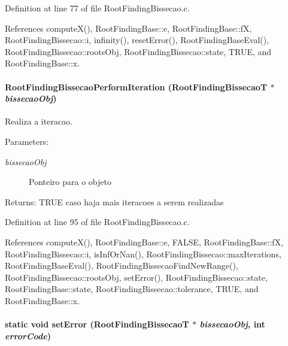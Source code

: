 Definition at line 77 of file RootFindingBissecao.c.

References computeX(), RootFindingBase::e, RootFindingBase::fX, RootFindingBissecao::i, infinity(), resetError(), RootFindingBaseEval(), RootFindingBissecao::rootsObj, RootFindingBissecao::state, TRUE, and RootFindingBase::x.\hypertarget{group____bissecao_g00f707bfd08d203eb0b941b6b09e5639}{
\paragraph[RootFindingBissecaoPerformIteration]{ RootFindingBissecaoPerformIteration ({\bf RootFindingBissecaoT} $\ast$ {\em bissecaoObj})}\hfill}
\label{group____bissecao_g00f707bfd08d203eb0b941b6b09e5639}


Realiza a iteracao. 

\begin{Desc}
\item[Parameters:]
\begin{description}
\item[{\em bissecaoObj}]Ponteiro para o objeto \end{description}
\end{Desc}
\begin{Desc}
\item[Returns:]TRUE caso haja mais iteracoes a serem realizadas \end{Desc}


Definition at line 95 of file RootFindingBissecao.c.

References computeX(), RootFindingBase::e, FALSE, RootFindingBase::fX, RootFindingBissecao::i, isInfOrNan(), RootFindingBissecao::maxIterations, RootFindingBaseEval(), RootFindingBissecaoFindNewRange(), RootFindingBissecao::rootsObj, setError(), RootFindingBissecao::state, RootFindingBase::state, RootFindingBissecao::tolerance, TRUE, and RootFindingBase::x.\hypertarget{group____bissecao_g35fd0bd3c36285504bfc64f6a4fc2727}{
\paragraph[setError]{\setlength{\rightskip}{0pt plus 5cm}static void setError ({\bf RootFindingBissecaoT} $\ast$ {\em bissecaoObj}, \/  int {\em errorCode})}\hfill}
\label{group____bissecao_g35fd0bd3c36285504bfc64f6a4fc2727}


